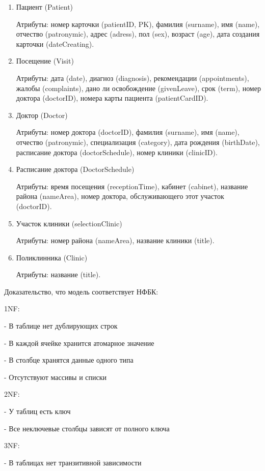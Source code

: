 \documentclass{article}
\begin{document}
\begin{enumerate}
    \item Пациент (Patient)

    Атрибуты: номер карточки (patientID, PK), фамилия (surname), имя (name), отчество (patronymic), адрес (adress), пол (sex), возраст (age), дата создания карточки (dateCreating).
    
    \item Посещение (Visit)

    Атрибуты: дата (date), диагноз (diagnosis), рекомендации (appointments), жалобы (complaints), дано ли освобождение (givenLeave), срок (term), номер доктора (doctorID), номера карты пациента (patientCardID).

    \item Доктор (Doctor)

    Атрибуты: номер доктора (doctorID), фамилия (surname), имя (name), отчество (patronymic), специализация (category), дата рождения (birthDate), расписание доктора (doctorSchedule), номер клиники (clinicID).

    \item Расписание доктора (DoctorSchedule)

    Атрибуты: время посещения (receptionTime), кабинет (cabinet), название района (nameArea), номер доктора, обслуживающего этот участок (doctorID).

    \item Участок клиники (selectionClinic)

    Атрибуты: номер района (nameArea), название клиники (title).

    \item Поликлинника (Clinic)

    Атрибуты: название (title).
\end{enumerate}

Доказательство, что модель соответствует НФБК:

1NF:

- В таблице нет дублирующих строк

- В каждой ячейке хранится атомарное значение

- В столбце хранятся данные одного типа

- Отсутствуют массивы и списки

2NF:

- У таблиц есть ключ

- Все неключевые столбцы зависят от полного ключа

3NF:

- В таблицах нет транзитивной зависимости
\end{document}
